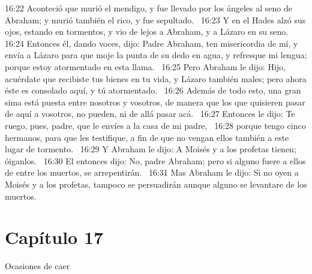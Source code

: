 16:22 Aconteció que murió el mendigo, y fue llevado por los ángeles al seno de Abraham; y murió también el rico, y fue sepultado.  
16:23 Y en el Hades alzó sus ojos, estando en tormentos, y vio de lejos a Abraham, y a Lázaro en su seno.  
16:24 Entonces él, dando voces, dijo: Padre Abraham, ten misericordia de mí, y envía a Lázaro para que moje la punta de su dedo en agua, y refresque mi lengua; porque estoy atormentado en esta llama.  
16:25 Pero Abraham le dijo: Hijo, acuérdate que recibiste tus bienes en tu vida, y Lázaro también males; pero ahora éste es consolado aquí, y tú atormentado.  
16:26 Además de todo esto, una gran sima está puesta entre nosotros y vosotros, de manera que los que quisieren pasar de aquí a vosotros, no pueden, ni de allá pasar acá.  
16:27 Entonces le dijo: Te ruego, pues, padre, que le envíes a la casa de mi padre,  
16:28 porque tengo cinco hermanos, para que les testifique, a fin de que no vengan ellos también a este lugar de tormento.  
16:29 Y Abraham le dijo: A Moisés y a los profetas tienen; óiganlos.  
16:30 El entonces dijo: No, padre Abraham; pero si alguno fuere a ellos de entre los muertos, se arrepentirán.  
16:31 Mas Abraham le dijo: Si no oyen a Moisés y a los profetas, tampoco se persuadirán aunque alguno se levantare de los muertos.  
\section*{Capítulo 17 }
Ocasiones de caer   

